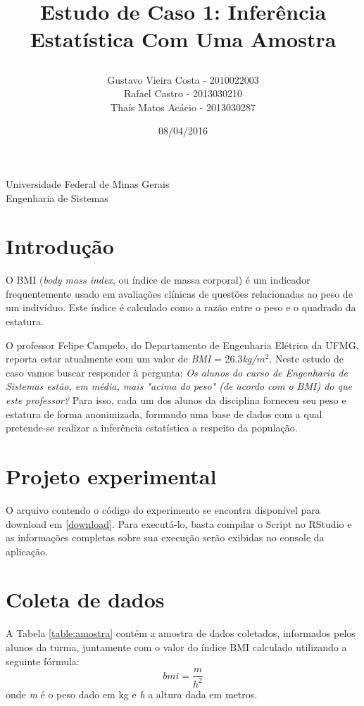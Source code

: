 \documentclass[12pt, a4paper]{article}
\title{
	\begin{large}
		Estudo de Caso 1: Inferência Estatística Com Uma Amostra
	\end{large}	}
\author{Gustavo Vieira Costa - 2010022003\\Rafael Castro - 2013030210\\Thaís Matos Acácio - 2013030287}
\date{08/04/2016}
\begin{document}
	\maketitle
	
	\vspace*{-7.5cm}
	{\bf
		\begin{center}
			{\large
				\hspace*{0cm}Universidade Federal de Minas Gerais} \\
			\hspace*{0cm}Engenharia de Sistemas  \\
		\end{center}
	}
	\vspace*{5cm}
	
\section{Introdução}
O BMI (\textit{body mass index}, ou índice de massa corporal) é um indicador frequentemente usado em avaliações clínicas de questões relacionadas ao peso de um indivíduo. Este índice é calculado como a razão entre o peso e o quadrado da estatura.
\par O professor Felipe Campelo, do Departamento de Engenharia Elétrica da UFMG, reporta estar atualmente com um valor de \textit{BMI} = 26.3\textit{kg/$m^{2}$}. Neste estudo de caso vamos buscar responder à pergunta: \textit{Os alunos do curso de Engenharia de Sistemas estão, em média, mais "acima do peso" (de acordo com o BMI) do que este professor?} Para isso, cada um dos alunos da disciplina forneceu seu peso e estatura de forma anonimizada, formando uma base de dados com a qual pretende-se realizar a inferência estatística a respeito da população.
	
\section{Projeto experimental}
O arquivo contendo o código do experimento se encontra disponível para download em \ref{download}. Para executá-lo, basta compilar o Script no RStudio e as informações completas sobre sua execução serão exibidas no console da aplicação.
	
\section{Coleta de dados}
A Tabela \ref{table:amostra} contém a amostra de dados coletados, informados pelos alunos da turma, juntamente com o valor do índice BMI calculado utilizando a seguinte fórmula:
\begin{equation}
bmi = \frac{m}{h^{2}}
\end{equation}
\newline onde \textit{m} é o peso dado em kg e \textit{h} a altura dada em metros.
	
\end{document}
